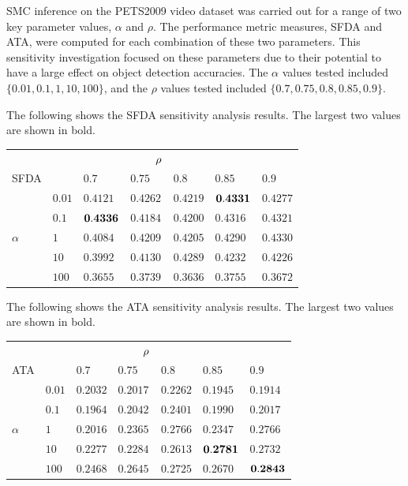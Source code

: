 \documentclass[smallcondensed, final]{svjour3}
\begin{document}
SMC inference on the PETS2009 video dataset was carried out for a range of two key parameter values, $\alpha$ and $\rho$. The performance metric measures, SFDA and ATA, were computed for each combination of these two parameters. This sensitivity investigation focused on these parameters due to their potential to have a large effect on object detection accuracies. The $\alpha$ values tested included $\{ 0.01, 0.1, 1, 10, 100 \}$, and the $\rho$ values tested included $\{ 0.7, 0.75, 0.8, 0.85, 0.9 \}$.

The following shows the SFDA sensitivity analysis results. The largest two values are shown in bold.
\begin{center}
\begin{tabular}[!]{l l  l  l  l  l  l}
  & & & $\hspace{8mm}\rho$ & & & \\
  SFDA  &  	& $0.7$ & $0.75$ & $0.8$ & $0.85$ & $0.9$  \\  
  &$0.01$ 	& $0.4121$ & $0.4262$ & $0.4219$ & $\bold{0.4331}$ & $0.4277$  \\
  &$0.1$  	& $\bold{0.4336}$ & $0.4184$ & $0.4200$ & $0.4316$ & $0.4321$  \\ 
$\alpha$ 	& $1$    & $0.4084$ & $0.4209$ & $0.4205$ & $0.4290$ & $0.4330$  \\  
  &$10$   	& $0.3992$ & $0.4130$ & $0.4289$ & $0.4232$ & $0.4226$  \\  
  &$100$  	& $0.3655$ & $0.3739$ & $0.3636$ & $0.3755$ & $0.3672$  \\
\end{tabular}
\end{center}

The following shows the ATA sensitivity analysis results. The largest two values are shown in bold.
\begin{center}
\begin{tabular}[!]{l l  l  l  l  l  l}
		& & & $\hspace{8mm}\rho$ & & & \\
 	 ATA  & 	 	& $0.7$ & $0.75$ & $0.8$ & $0.85$ & $0.9$  \\  
	  &$0.01$ 		& $0.2032$ & $0.2017$ & $0.2262$ & $0.1945$ & $0.1914$  \\
		  &$0.1$ 	& $0.1964$ & $0.2042$ & $0.2401$ & $0.1990$ & $0.2017$  \\
$\alpha$ & $1$  	& $0.2016$ & $0.2365$ & $0.2766$ & $0.2347$ & $0.2766$  \\   
  		&$10$   	& $0.2277$ & $0.2284$ & $0.2613$ & $\bold{0.2781}$ & $0.2732$  \\  
 		 &$100$ 	& $0.2468$ & $0.2645$ & $0.2725$ & $0.2670$ & $\bold{0.2843}$  \\
\end{tabular}
\end{center}
\end{document}
